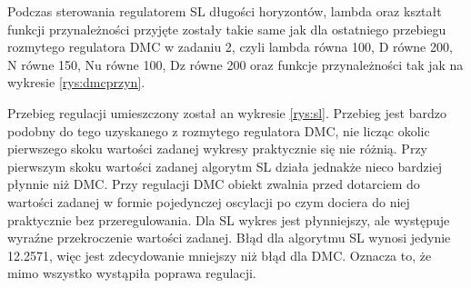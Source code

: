 	
	Podczas sterowania regulatorem SL długości horyzontów, lambda oraz kształt funkcji przynależności przyjęte zostały takie same jak dla ostatniego przebiegu rozmytego regulatora DMC w zadaniu 2, czyli lambda równa 100, D równe 200, N równe 150, Nu równe 100, Dz równe 200 oraz funkcje przynależności tak jak na wykresie \ref{rys:dmcprzyn}.
	
	Przebieg regulacji umieszczony został an wykresie \ref{rys:sl}. Przebieg jest bardzo podobny do tego uzyskanego z rozmytego regulatora DMC, nie licząc okolic pierwszego skoku wartości zadanej wykresy praktycznie się nie różnią. Przy pierwszym skoku wartości zadanej algorytm SL działa jednakże nieco bardziej płynnie niż DMC. Przy regulacji DMC obiekt zwalnia przed dotarciem do wartości zadanej w formie pojedynczej oscylacji po czym dociera do niej praktycznie bez przeregulowania. Dla SL wykres jest płynniejszy, ale występuje wyraźne przekroczenie wartości zadanej. Błąd dla algorytmu SL wynosi jedynie 12.2571, więc jest zdecydowanie mniejszy niż błąd dla DMC. Oznacza to, że mimo wszystko wystąpiła poprawa regulacji.
